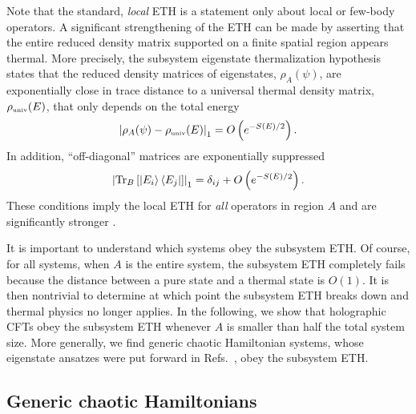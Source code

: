 \documentclass[a4paper,11pt]{article}
\newcommand{\Tr}{\text{Tr}}
\begin{document}
Note that the standard, \textit{local} ETH 
is a statement only about local or few-body operators. A significant strengthening of the ETH 
can be made by asserting that the entire reduced density matrix supported on a finite spatial region appears thermal. More precisely, the subsystem eigenstate thermalization hypothesis states that the reduced density matrices of eigenstates, $\rho_A(\psi)$, are exponentially close in trace distance to a universal thermal density matrix, $\rho_{\mbox{\tiny univ}}(E)$, that only depends on the total energy \cite{2018PhRvE..97a2140D,2018PhRvX...8b1026G}
\begin{align}
    \left|\rho_A(\psi) - \rho_{\mbox{\tiny univ}}(E) \right|_1 = O\left(e^{-S(E)/2}\right).
    \label{SETH1}
\end{align} 
In addition, ``off-diagonal'' matrices are exponentially suppressed
\begin{align}
    \left|\Tr_B\left[\ket{E_i}\bra{E_j} \right] \right|_1 = \delta_{ij}+  O\left(e^{-S(E)/2}\right).
    \label{SETH2}
\end{align}
These conditions imply the local ETH for \textit{all} operators in region $A$ and are significantly stronger \cite{2016arXiv161000302L}. 

It is important to understand which systems obey the subsystem ETH. Of course, for all systems, when $A$ is the entire system, 
the subsystem ETH 
completely fails because the distance between a pure state and a thermal state is $O(1)$. It is then nontrivial to determine at which point the subsystem ETH breaks down and thermal physics no longer applies. In the following, we show that holographic CFTs obey the subsystem ETH 
whenever $A$ is smaller than half the total system size. More generally, we find generic chaotic Hamiltonian systems, whose eigenstate ansatzes were put forward in Refs.~\cite{2010NJPh...12g5021D,2017arXiv170908784L,2019PhRvE.100b2131M}, obey the subsystem ETH.


\subsection{Generic chaotic Hamiltonians}
\end{document}
